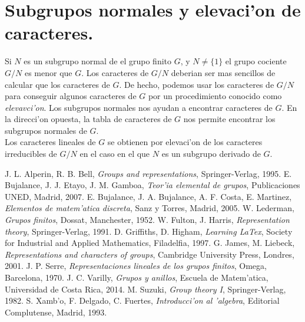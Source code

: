 \documentclass[a4paper,openright,12pt]{book}
\numberwithin{equation}{section} %
\begin{document}
\section{Subgrupos normales y elevaci'on de caracteres.}
Si $N$ es un subgrupo normal de el grupo finito $G$, y $N \neq \{ 1 \}$ el  grupo cociente $G/N$ es menor que $G$. Los caracteres de $G/N$ deberian ser mas sencillos de calcular que los caracteres de $G$. De hecho, podemos usar los caracteres de $G/N$ para conseguir algunos caracteres de $G$ por un procedimiento conocido como \emph{elevavci'on}. Los subgrupos normales nos ayudan a encontrar caracteres de $G$. En la direcci'on opuesta, la tabla de caracteres de $G$ nos permite encontrar los subgrupos normales de $G$.\\
Los caracteres lineales de $G$ se obtienen por elevaci'on de los caracteres irreducibles de $G/N$ en el caso en el que $N$ es un subgrupo derivado de $G$.
\newpage
$\ $
\thispagestyle{empty}
\begin{thebibliography}{9}
 J. L. Alperin, R. B. Bell, \emph{Groups and representations}, Springer-Verlag, 1995.
 E. Bujalance, J. J. Etayo, J. M. Gamboa, \emph{Teor'ia elemental de grupos}, Publicaciones UNED, Madrid, 2007.
 E. Bujalance, J. A. Bujalance, A. F. Costa, E. Martinez, \emph{Elementos de matem'atica discreta}, Sanz y Torres, Madrid, 2005.
 W. Lederman, \emph{Grupos finitos}, Dossat, Manchester, 1952.
 W. Fulton, J. Harris, \emph{Representation theory}, Springer-Verlag, 1991.
 D. Griffiths, D. Higham, \emph{Learning LaTex}, Society for Industrial and Applied Mathematics, Filadelfia, 1997.
 G. James, M. Liebeck, \emph{Representations and characters of groups}, Cambridge University Press, Londres, 2001.
 J. P. Serre, \emph{Representaciones lineales de los grupos finitos}, Omega, Barcelona, 1970.
 J. C. Varilly, \emph{Grupos y anillos}, Escuela de Matem'atica, Universidad de Costa Rica, 2014. 
 M. Suzuki, \emph{Group theory I}, Springer-Verlag, 1982. 
 S. Xamb'o, F. Delgado, C. Fuertes, \emph{Introducci'on al 'algebra}, Editorial Complutense, Madrid, 1993.
\end{thebibliography}
\end{document}
